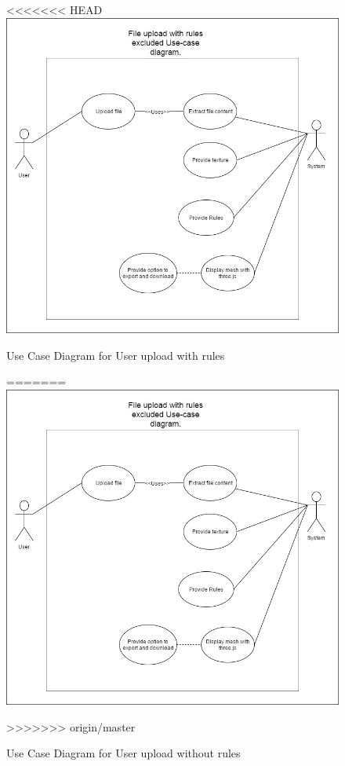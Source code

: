 \documentclass[english]{article}
\begin{document}
		\begin{figure}[h]
<<<<<<< HEAD
			\includegraphics[width=\textwidth]{norules.jpg}
			\caption{Use Case Diagram for User upload with rules }
=======
			\includegraphics[width=\textwidth]{Use Cases/norules.jpg}
			\caption{Use Case Diagram for User upload without rules }
>>>>>>> origin/master
		\end{figure}
\end{document}
